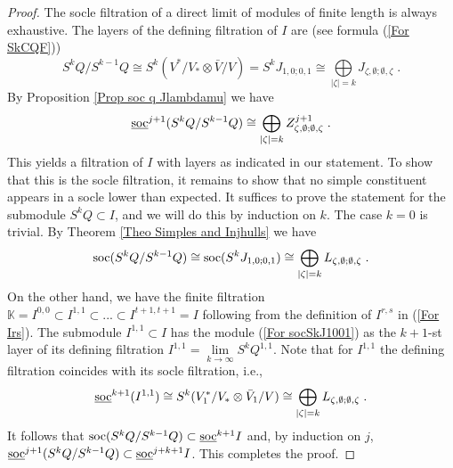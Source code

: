 \documentclass[12pt]{article}
\def\KK {{\mathbb K}}     %
\def\ul  {\underline}
\begin{document}
\begin{proof}
The socle filtration of a direct limit of modules of finite length is always exhaustive. The layers of the defining filtration of $I$ are (see formula (\ref{For SkCQF}))
$$
S^kQ/S^{k-1}Q\cong S^k(V^*/V_*\otimes \bar V/V)=S^k J_{1,0;0,1} \cong \bigoplus\limits_{|\zeta|=k} J_{\zeta,\emptyset;\emptyset,\zeta} \;.
$$
By Proposition \ref{Prop soc q Jlambdamu} we have
$$
\ul{\rm soc}^{j+1}(S^kQ/S^{k-1}Q)\cong\bigoplus\limits_{|\zeta|=k} Z^{j+1}_{\zeta,\emptyset;\emptyset,\zeta} \;.
$$
This yields a filtration of $I$ with layers as indicated in our statement. To show that this is the socle filtration, it remains to show that no simple constituent appears in a socle lower than expected. It suffices to prove the statement for the submodule $S^kQ\subset I$, and we will do this by induction on $k$. The case $k=0$ is trivial. By Theorem \ref{Theo Simples and Injhulls} we have
\begin{gather}\label{For socSkJ1001}
{\rm soc}(S^kQ/S^{k-1}Q) \cong {\rm soc}(S^kJ_{1,0;0,1})\cong \bigoplus\limits_{|\zeta|=k} L_{\zeta,\emptyset;\emptyset,\zeta} \;.
\end{gather}
On the other hand, we have the finite filtration $\KK=I^{0,0}\subset I^{1,1}\subset... \subset I^{t+1,t+1}=I$ following from the definition of $I^{r,s}$ in (\ref{For Irs}). The submodule $I^{1,1}\subset I$ has the module (\ref{For socSkJ1001}) as the $k+1$-st layer of its defining filtration $I^{1,1}=\lim\limits_{k\to\infty} S^{k}Q^{1,1}$. Note that for $I^{1,1}$ the defining filtration coincides with its socle filtration, i.e.,
$$
\ul{\rm soc}^{k+1}(I^{1,1})\cong S^k(V_{1}^*/V_*\otimes \bar V_{1}/V) \cong \bigoplus\limits_{|\zeta|=k} L_{\zeta,\emptyset;\emptyset,\zeta} \;.
$$
It follows that ${\rm soc}(S^kQ/S^{k-1}Q)\subset \ul{\rm soc}^{k+1}I$ and, by induction on $j$, $\ul{\rm soc}^{j+1}(S^kQ/S^{k-1}Q)\subset \ul{\rm soc}^{j+k+1}I$. This completes the proof.
\end{proof}
\end{document}
